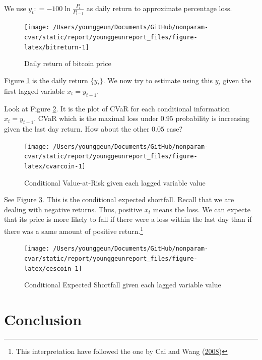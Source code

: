 \documentclass[
]{article}
\theoremstyle{definition}
\theoremstyle{definition}
\theoremstyle{definition}
\theoremstyle{remark}
\begin{document}
We use \(y_t \mathpunct{:}=- 100 \ln \frac{P_t}{P_{t - 1}}\) as daily return to approximate percentage loss.

\begin{figure}[H]

{\centering \texttt{[image: /Users/younggeun/Documents/GitHub/nonparam-cvar/static/report/younggeunreport\_files/figure-latex/bitreturn-1]} 

}

\caption{Daily return of bitcoin price}\label{fig:bitreturn}
\end{figure}

Figure \ref{fig:bitreturn} is the daily return \(\{ y_t \}\). We now try to estimate using this \(y_t\) given the first lagged variable \(x_t = y_{t - 1}\).

Look at Figure \ref{fig:cvarcoin}. It is the plot of CVaR for each conditional information \(x_t = y_{t - 1}\). CVaR which is the maximal loss under \(0.95\) probability is increasing given the last day return. How about the other \(0.05\) case?

\begin{figure}[H]

{\centering \texttt{[image: /Users/younggeun/Documents/GitHub/nonparam-cvar/static/report/younggeunreport\_files/figure-latex/cvarcoin-1]} 

}

\caption{Conditional Value-at-Risk given each lagged variable value}\label{fig:cvarcoin}
\end{figure}

See Figure \ref{fig:cescoin}. This is the conditional expected shortfall. Recall that we are dealing with negative returns. Thus, positive \(x_t\) means the loss. We can expecte that its price is more likely to fall if there were a loss within the last day than if there was a same amount of positive return.\footnote{This interpretation have followed the one by Cai and Wang (\protect\hyperlink{ref-cai:2008aa}{2008})}

\begin{figure}[H]

{\centering \texttt{[image: /Users/younggeun/Documents/GitHub/nonparam-cvar/static/report/younggeunreport\_files/figure-latex/cescoin-1]} 

}

\caption{Conditional Expected Shortfall given each lagged variable value}\label{fig:cescoin}
\end{figure}

\hypertarget{conclusion}{%
\section{Conclusion}\label{conclusion}}
\end{document}
